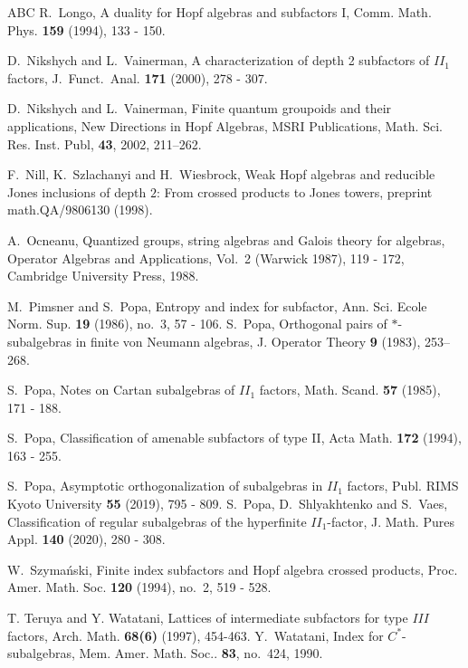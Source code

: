 \documentclass{amsart}
\theoremstyle{definition}
\theoremstyle{theorem}
\begin{document}
\begin{thebibliography}{ABC}
   R.~Longo, A duality for Hopf algebras and subfactors I,
    Comm. Math. Phys. {\bf 159} (1994), 133 - 150.


 D.~Nikshych and L.~Vainerman, A characterization of
  depth 2 subfactors of $II_1$ factors, J.~Funct.~Anal. {\bf 171}
  (2000), 278 - 307.

 D.~Nikshych and L.~Vainerman, Finite quantum groupoids
  and their applications, New Directions in Hopf Algebras, MSRI
  Publications, Math. Sci. Res. Inst. Publ, {\bf 43}, 2002, 211--262.


 F.~Nill, K.~Szlachanyi and H.~Wiesbrock, Weak Hopf
  algebras and reducible Jones inclusions of depth $2$: From crossed
  products to Jones towers, preprint math.QA/9806130 (1998).

 A.~Ocneanu, Quantized groups, string algebras and Galois
  theory for algebras, Operator Algebras and Applications, Vol.~2
  (Warwick 1987), 119 - 172, Cambridge University Press,
  1988.

   M.~Pimsner and S.~Popa, Entropy and index for
    subfactor, Ann. Sci. Ecole Norm. Sup. {\bf 19} (1986), no.~3, 57 -
    106.
 S.~Popa, Orthogonal pairs of {$\ast $}-subalgebras in
  finite von {N}eumann algebras, J. Operator Theory {\bf 9} (1983),
  253--268.

    
   S.~Popa, Notes on Cartan subalgebras of $II_1$
    factors, Math. Scand. {\bf 57} (1985), 171 - 188.

 S.~Popa, Classification of amenable subfactors of
  type II, Acta Math. {\bf 172} (1994), 163 - 255. 
  

  S.~Popa, Asymptotic orthogonalization of subalgebras
   in $II_1$ factors, Publ.  RIMS Kyoto University {\bf 55} (2019),
   795 - 809.
 S.~Popa, D.~Shlyakhtenko and S.~Vaes, Classification of
  regular subalgebras of the hyperfinite $II_1$-factor, J. 
  Math. Pures  Appl. {\bf 140} (2020), 280 - 308.

 W.~Szyma\'{n}ski, Finite index subfactors and Hopf
   algebra crossed products, Proc.  Amer. Math. Soc. {\bf 120} (1994),
   no.~2, 519 - 528.
   
  T. Teruya and Y. Watatani, Lattices of intermediate
   subfactors for type $III$ factors, Arch. Math. {\bf 68(6)} (1997),
   454-463.  \color{black}
 Y.~Watatani, Index for $C^*$-subalgebras,
  Mem. Amer. Math. Soc.. {\bf 83}, no.~424, 1990.

\end{thebibliography}
\end{document}
